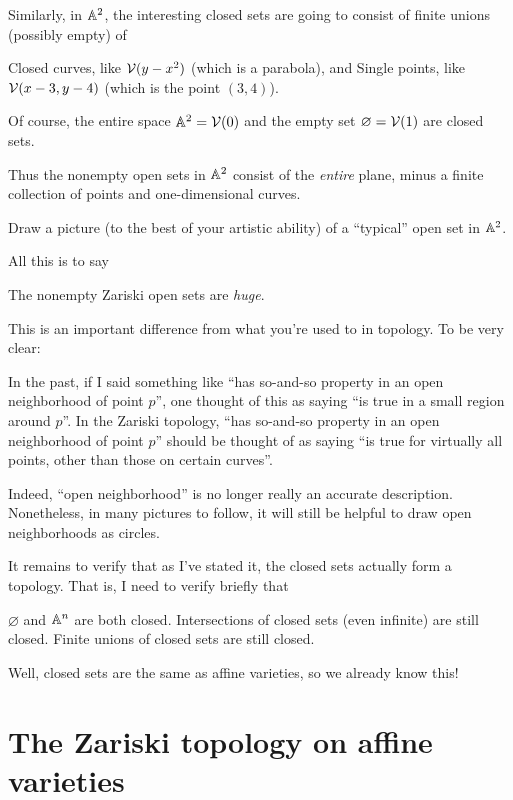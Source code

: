 \begin{example}
	Similarly, in $\mathbb A^2$,
	the interesting closed sets are going to consist
	of finite unions (possibly empty) of
	\begin{itemize}
		\ii Closed curves,
		like $\mathcal V(y-x^2)$ (which is a parabola), and
		\ii Single points, like $\mathcal V(x-3,y-4)$
		(which is the point $(3,4)$).
	\end{itemize}
	Of course, the entire space $\mathbb A^2 = \mathcal V(0)$ and the empty set $\varnothing = \mathcal V(1)$
	are closed sets.

	Thus the nonempty open sets in $\mathbb A^2$ consist of the \emph{entire} plane,
	minus a finite collection of points and one-dimensional curves.
\end{example}
\begin{ques}
	Draw a picture (to the best of your artistic ability)
	of a ``typical'' open set in $\mathbb A^2$.
\end{ques}

All this is to say
\begin{moral}
	The nonempty Zariski open sets are \emph{huge}.
\end{moral}
This is an important difference from what you're used to in topology.
To be very clear:
\begin{itemize}
	\ii In the past, if I said something like
	``has so-and-so property in an open neighborhood of point $p$'',
	one thought of this as saying
	``is true in a small region around $p$''.
	\ii In the Zariski topology,
	``has so-and-so property in an open neighborhood of point $p$''
	should be thought of as saying ``is true for virtually all points,
	other than those on certain curves''.
\end{itemize}
Indeed, ``open neighborhood'' is no longer really an accurate description.
Nonetheless, in many pictures to follow,
it will still be helpful to draw open neighborhoods as circles.

It remains to verify that as I've stated it, the closed sets actually form a topology.
That is, I need to verify briefly that
\begin{itemize}
	\ii $\varnothing$ and $\mathbb A^n$ are both closed.
	\ii Intersections of closed sets (even infinite) are still closed.
	\ii Finite unions of closed sets are still closed.
\end{itemize}
Well, closed sets are the same as affine varieties,
so we already know this!

\section{The Zariski topology on affine varieties}

